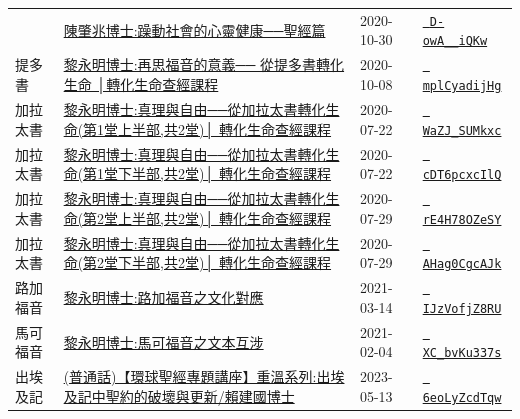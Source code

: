 \documentclass{book}
\begin{document}
{\begin{xltabular}{\textwidth}{|p{0.15\textwidth} p{0.6\textwidth}|p{0.07\textwidth} p{0.1\textwidth}|}
    & \hyperref[sec:D_owA__iQKw]{陳肇兆博士:躁動社會的心靈健康──聖經篇} & 2020-10-30 & \href{https://youtube.com/watch?v=D-owA__iQKw}{\texttt{ D-owA\_\_iQKw}} \\
提多書   & \hyperref[sec:mplCyadijHg]{黎永明博士:再思福音的意義── 從提多書轉化生命 │轉化生命查經課程} & 2020-10-08 & \href{https://youtube.com/watch?v=mplCyadijHg}{\texttt{ mplCyadijHg}} \\
加拉太書   & \hyperref[sec:WaZJ_SUMkxc]{黎永明博士:真理與自由──從加拉太書轉化生命(第1堂上半部,共2堂)│ 轉化生命查經課程} & 2020-07-22 & \href{https://youtube.com/watch?v=WaZJ_SUMkxc}{\texttt{ WaZJ\_SUMkxc}} \\
加拉太書   & \hyperref[sec:cDT6pcxcIlQ]{黎永明博士:真理與自由──從加拉太書轉化生命(第1堂下半部,共2堂)│ 轉化生命查經課程} & 2020-07-22 & \href{https://youtube.com/watch?v=cDT6pcxcIlQ}{\texttt{ cDT6pcxcIlQ}} \\
加拉太書   & \hyperref[sec:rE4H78OZeSY]{黎永明博士:真理與自由──從加拉太書轉化生命(第2堂上半部,共2堂)│ 轉化生命查經課程} & 2020-07-29 & \href{https://youtube.com/watch?v=rE4H78OZeSY}{\texttt{ rE4H78OZeSY}} \\
加拉太書   & \hyperref[sec:AHag0CgcAJk]{黎永明博士:真理與自由──從加拉太書轉化生命(第2堂下半部,共2堂)│ 轉化生命查經課程} & 2020-07-29 & \href{https://youtube.com/watch?v=AHag0CgcAJk}{\texttt{ AHag0CgcAJk}} \\
路加福音   & \hyperref[sec:IJzVofjZ8RU]{黎永明博士:路加福音之文化對應} & 2021-03-14 & \href{https://youtube.com/watch?v=IJzVofjZ8RU}{\texttt{ IJzVofjZ8RU}} \\
馬可福音   & \hyperref[sec:XC_bvKu337s]{黎永明博士:馬可福音之文本互涉} & 2021-02-04 & \href{https://youtube.com/watch?v=XC_bvKu337s}{\texttt{ XC\_bvKu337s}} \\
出埃及記   & \hyperref[sec:6eoLyZcdTqw]{(普通話)【環球聖經專題講座】重溫系列:出埃及記中聖約的破壞與更新/賴建國博士} & 2023-05-13 & \href{https://youtube.com/watch?v=6eoLyZcdTqw}{\texttt{ 6eoLyZcdTqw}} \\
\end{xltabular}
}
\newpage
\end{document}

